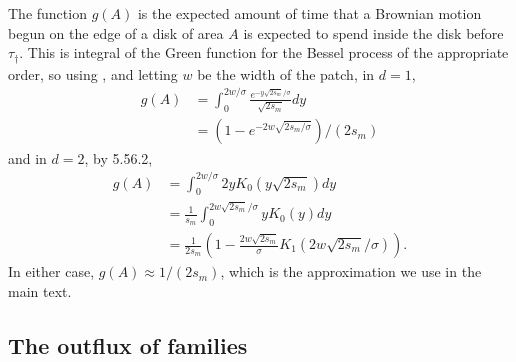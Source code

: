 \documentclass{article}
\newcommand{\citet}[1]{\cite{#1}}
\newcommand{\E}{\mathbb{E}}
\newcommand{\one}{\mathbf{1}}
\begin{document}
The function $g(A)$ is the expected amount of time that a Brownian motion begun on the edge of a disk of area $A$
is expected to spend inside the disk before $\tau_\dagger$.
This is integral of the Green function for the Bessel process of the appropriate order, 
so using \citet{borodin2002handbook}, %
and letting $w$ be the width of the patch,
in $d=1$,
\begin{align} \label{eqn:gA_1D}
    g(A) %
  &= \int_0^{2w/\sigma} \frac{ e^{- y \sqrt{2s_m}/\sigma }}{\sqrt{2s_m}} dy \\
  &= (1-e^{-2w\sqrt{2s_m/\sigma}})/(2s_m)
\end{align}
and in $d=2$, by \citet{gradshteyn2007table} 5.56.2,
\begin{align}
    g(A) %
  &= \int_0^{2w/\sigma} 2 y K_0(y \sqrt{2s_m}) dy \\
  &= \frac{1}{s_m}\int_0^{2w\sqrt{2s_m}/\sigma} y K_0(y) dy \\
  &= \frac{1}{2s_m}\left(1- \frac{2w\sqrt{2s_m}}{\sigma} K_1(2w\sqrt{2s_m}/\sigma) \right)  .
\end{align}
In either case, $g(A) \approx 1/(2s_m)$, which is the approximation we use in the main text.




\subsection[Outflux of Families]{The outflux of families}
\label{apx:outflux}
\end{document}
